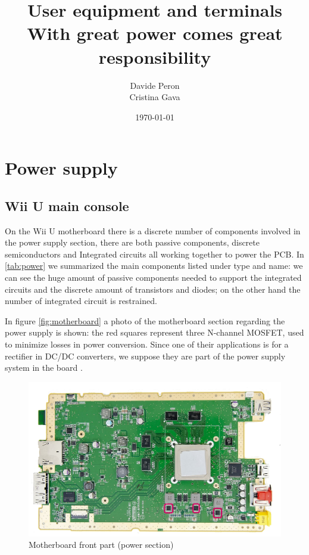 \documentclass[11pt,a4paper,titlepage]{article}
\title{\blue User equipment and terminals \\
\blueb With great power comes great responsibility}
\author{Davide Peron\\ Cristina Gava}
\date{\today}
\begin{document}
\maketitle

\tableofcontents
\clearpage

\section{Power supply}
  \subsection{Wii U main console}
      On the Wii U motherboard there is a discrete number of components involved in the power supply section, there are both passive components, discrete semiconductors and Integrated circuits all working together to power the PCB. In \autoref{tab:power} we summarized the main components listed under type and name: we can see the huge amount of passive components needed to support the integrated circuits and the discrete amount of transistors and      diodes; on the other hand the number of integrated circuit is restrained.

      In figure \autoref{fig:motherboard} a photo of the motherboard section regarding the power supply is shown: the red squares represent three N-channel MOSFET, used to minimize losses in power conversion. Since one of their applications is for a rectifier in DC/DC converters, we suppose they are part of the power supply system in the board \cite{mosfet8026}.

      \begin{figure}
        \centering
        \includegraphics[width = .85\textwidth]{motherboard_front.png}
        \caption{Motherboard front part (power section)}
        \label{fig:motherboard}
      \end{figure}
\end{document}

